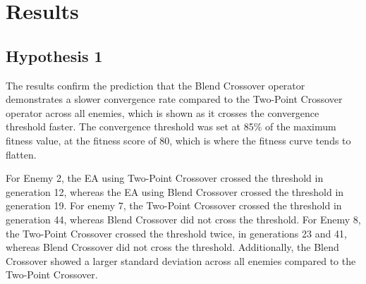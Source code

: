 \section{Results}

\subsection{Hypothesis 1}
The results confirm the prediction that the Blend Crossover operator demonstrates a slower convergence rate compared to the Two-Point Crossover operator across all enemies, which is shown as it crosses the convergence threshold faster.
The convergence threshold was set at 85\% of the maximum fitness value, at the fitness score of 80, which is where the fitness curve tends to flatten.

For Enemy 2, the EA using Two-Point Crossover crossed the threshold in generation 12, whereas the EA using Blend Crossover crossed the threshold in generation 19.
For enemy 7, the Two-Point Crossover crossed the threshold in generation 44, whereas Blend Crossover did not cross the threshold.
For Enemy 8, the Two-Point Crossover crossed the threshold twice, in generations 23 and 41, whereas Blend Crossover did not cross the threshold.
Additionally, the Blend Crossover showed a larger standard deviation across all enemies compared to the Two-Point Crossover.

